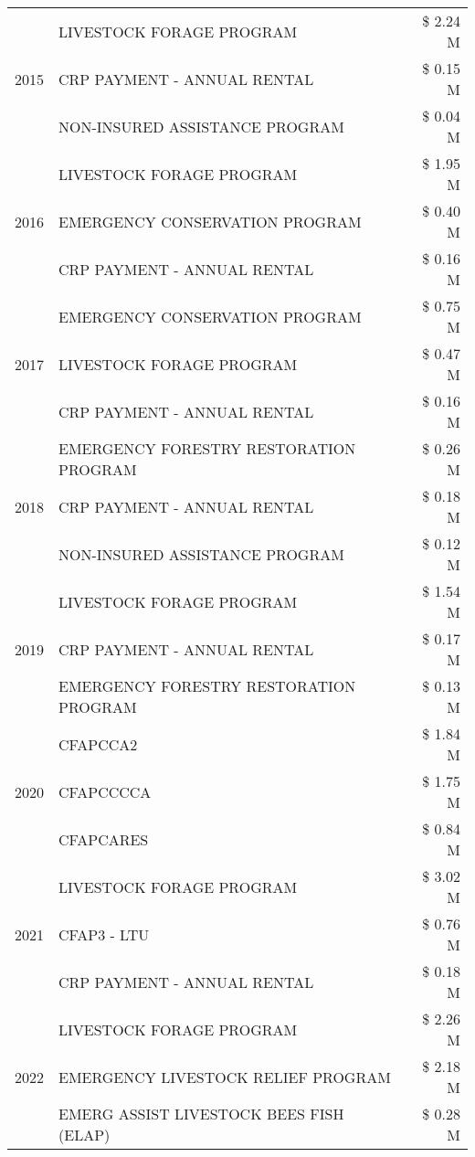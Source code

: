 \begin{tabular}{llr}
\cline{1-3}
\multirow[t]{3}{*}{2015} & LIVESTOCK FORAGE PROGRAM & \$ 2.24 M \\
 & CRP PAYMENT - ANNUAL RENTAL & \$ 0.15 M \\
 & NON-INSURED ASSISTANCE PROGRAM & \$ 0.04 M \\
\cline{1-3}
\multirow[t]{3}{*}{2016} & LIVESTOCK FORAGE PROGRAM & \$ 1.95 M \\
 & EMERGENCY CONSERVATION PROGRAM & \$ 0.40 M \\
 & CRP PAYMENT - ANNUAL RENTAL & \$ 0.16 M \\
\cline{1-3}
\multirow[t]{3}{*}{2017} & EMERGENCY CONSERVATION PROGRAM & \$ 0.75 M \\
 & LIVESTOCK FORAGE PROGRAM & \$ 0.47 M \\
 & CRP PAYMENT - ANNUAL RENTAL & \$ 0.16 M \\
\cline{1-3}
\multirow[t]{3}{*}{2018} & EMERGENCY FORESTRY RESTORATION PROGRAM & \$ 0.26 M \\
 & CRP PAYMENT - ANNUAL RENTAL & \$ 0.18 M \\
 & NON-INSURED ASSISTANCE PROGRAM & \$ 0.12 M \\
\cline{1-3}
\multirow[t]{3}{*}{2019} & LIVESTOCK FORAGE PROGRAM & \$ 1.54 M \\
 & CRP PAYMENT - ANNUAL RENTAL & \$ 0.17 M \\
 & EMERGENCY FORESTRY RESTORATION PROGRAM & \$ 0.13 M \\
\cline{1-3}
\multirow[t]{3}{*}{2020} & CFAPCCA2 & \$ 1.84 M \\
 & CFAPCCCCA & \$ 1.75 M \\
 & CFAPCARES & \$ 0.84 M \\
\cline{1-3}
\multirow[t]{3}{*}{2021} & LIVESTOCK FORAGE PROGRAM & \$ 3.02 M \\
 & CFAP3 - LTU & \$ 0.76 M \\
 & CRP PAYMENT - ANNUAL RENTAL & \$ 0.18 M \\
\cline{1-3}
\multirow[t]{3}{*}{2022} & LIVESTOCK FORAGE PROGRAM & \$ 2.26 M \\
 & EMERGENCY LIVESTOCK RELIEF PROGRAM & \$ 2.18 M \\
 & EMERG ASSIST LIVESTOCK BEES FISH (ELAP) & \$ 0.28 M \\
\cline{1-3}
\bottomrule
\end{tabular}
